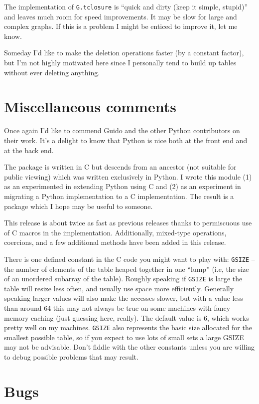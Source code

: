 The implementation of {\tt G.tclosure} is 
``quick and dirty (keep it simple, stupid)''
and leaves much room for speed improvements.  It may be
slow for large and complex graphs.  If this is a problem
I might be enticed to improve it, let me know.

Someday I'd like to make the deletion operations faster
(by a constant factor),
but I'm not highly motivated here since I personally tend
to build up tables without ever deleting anything.

\section{Miscellaneous comments}

Once again I'd like to commend Guido and the other Python
contributors on their work.  It's a delight to know that
Python is nice both at the front end and at the back end.

The package is written in C but
descends from an ancestor (not suitable for public
viewing) which was written exclusively in Python.  I wrote
this module (1) as an experimented in extending Python using
C and (2) as an experiment in migrating a Python implementation
to a C implementation.  The result is a package which
I hope may be useful to someone.  

This release is about twice as fast as previous releases thanks to
permiscuous use of C macros in the implementation.  Additionally,
mixed-type operations, coercions, and a few additional methods have
been added in this release.

There is one defined constant in the C code you might
want to play with: {\tt GSIZE} -- the number of
elements of the table heaped together in one ``lump''
(i.e, the size of an unordered subarray of the table).
Roughly speaking if
{\tt GSIZE} is large the table will resize less often, and usually
use space more efficiently.  Generally speaking
larger values will also make the accesses slower, but with
a value less than around 64 this may not always be true on some
machines with fancy memory caching (just guessing here, really).
The default value is 6, which works pretty well on my machines.
{\tt GSIZE} also represents the basic size allocated for the
smallest possible table, so if you expect to use lots of small
sets a large GSIZE may not be advisable.
Don't fiddle with the other constants unless you are willing
to debug possible problems that may result.

\section{Bugs}

